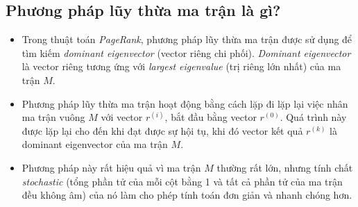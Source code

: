         \subsection{Phương pháp lũy thừa ma trận là gì? \cite{Power_Iteration}}
           
         \begin{itemize}
            \item Trong thuật toán \emph{PageRank}, phương pháp lũy thừa ma trận được sử dụng để tìm kiếm \emph{dominant eigenvector} (vector riêng chi phối). \emph{Dominant eigenvector} là vector riêng tương ứng với \emph{largest eigenvalue} (trị riêng lớn nhất) của ma trận $M$.
            \item  Phương pháp lũy thừa ma trận hoạt động bằng cách lặp đi lặp lại việc nhân ma trận vuông $M$ với vector $r^{(i)}$, bắt đầu bằng vector $r^{(0)}$. Quá trình này được lặp lại cho đến khi đạt được sự hội tụ, khi đó vector kết quả $r^{(k)}$ là dominant eigenvector của ma trận $M$.
            \item Phương pháp này rất hiệu quả vì ma trận $M$ thường rất lớn, nhưng tính chất \textit{stochastic} (tổng phần tử của mỗi cột bằng 1 và tất cả phần tử của ma trận đều không âm) của nó làm cho phép tính toán đơn giản và nhanh chóng hơn.
        \end{itemize}          
